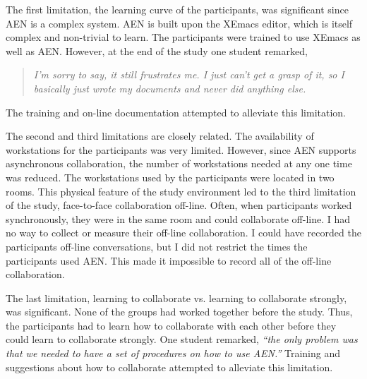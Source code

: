 The first limitation, the learning curve of the participants, was
significant since AEN is a complex system.  AEN is built upon the XEmacs
editor, which is itself complex and non-trivial to learn.  The participants were
trained to use XEmacs as well as AEN.  However, at the end of the study one
student remarked,
\begin{quote} 
{\em I'm sorry to say, it still frustrates me.  I just can't
get a grasp of it, so I basically just wrote my documents and never did
anything else.}
\end{quote}
The training and on-line documentation attempted to alleviate this
limitation.

The second and third limitations are closely related.  The availability of
workstations for the participants was very limited.  However, since AEN
supports asynchronous collaboration, the number of workstations needed at
any one time was reduced.  The workstations used by the participants were
located in two rooms.  This physical feature of the study environment led
to the third limitation of the study, face-to-face collaboration off-line.
Often, when participants worked synchronously, they were in the same room
and could collaborate off-line.  I had no way to collect or measure their
off-line collaboration.  I could have recorded the participants off-line
conversations, but I did not restrict the times the participants used AEN.
This made it impossible to record all of the off-line collaboration.

The last limitation, learning to collaborate vs. learning to collaborate
strongly, was significant.  None of the groups had worked together before
the study.  Thus, the participants had to learn how to collaborate with
each other before they could learn to collaborate strongly.  One student
remarked, {\em ``the only problem was that we needed to have a set of
procedures on how to use AEN.''}  Training and suggestions about how to
collaborate attempted to alleviate this limitation.


